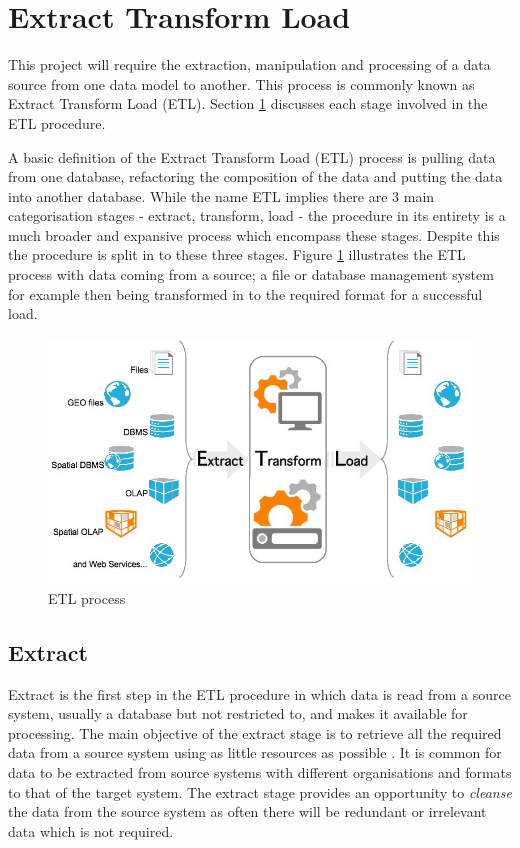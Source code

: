 \section{Extract Transform Load}\label{etlprocess}
This project will require the extraction, manipulation and processing of a data source from one data model to another. This process is commonly known as Extract Transform Load (ETL). Section \ref{etlprocess} discusses each stage involved in the ETL procedure. 

A basic definition of the Extract Transform Load (ETL) process is pulling data from one database, refactoring the composition of the data and putting the data into another database. While the name ETL implies there are 3 main categorisation stages - extract, transform, load - the procedure in its entirety is a much broader and expansive process which encompass these stages. Despite this the procedure is split in to these three stages. Figure \ref{fig:etl} illustrates the ETL process with data coming from a source; a file or database management system for example then being transformed in to the required format for a successful load. \begin{figure}[h]\begin{center}\includegraphics[width=0.8\linewidth]{images/etl.jpg}\caption{ETL process}\label{fig:etl}\end{center}\end{figure}

\subsection{Extract}
Extract is the first step in the ETL procedure in which data is read from a source system, usually a database but not restricted to, and makes it available for processing. The main objective of the extract stage is to retrieve all the required data from a source system using as little resources as possible \cite{etlref1}. It is common for data to be extracted from source systems with different organisations and formats to that of the target system. The extract stage provides an opportunity to \textit{cleanse} the data from the source system as often there will be redundant or irrelevant data which is not required.

